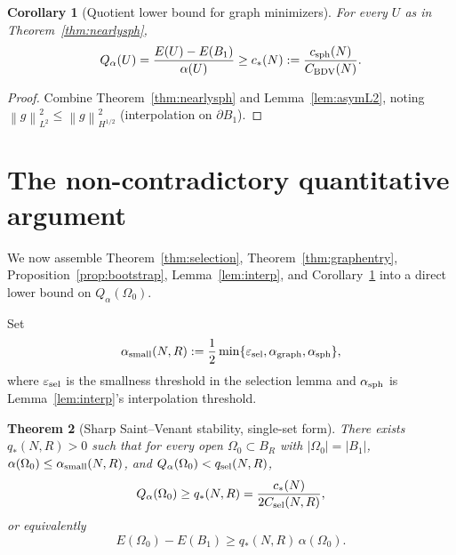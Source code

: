 \documentclass[11pt]{article}
\newtheorem{theorem}{Theorem}
\newtheorem{corollary}[theorem]{Corollary}
\theoremstyle{definition}
\newcommand{\norm}[1]{\left\|#1\right\|}
\newcommand{\abs}[1]{\left|#1\right|}
\begin{document}
\begin{corollary}[Quotient lower bound for graph minimizers]\label{cor:Qlower}
For every $U$ as in Theorem~\ref{thm:nearlysph},
\[
Q_\alpha(U)=\frac{E(U)-E(B_1)}{\alpha(U)}\ge c_*(N):=\frac{c_{\rm sph}(N)}{C_{\rm BDV}(N)}.
\]
\end{corollary}

\begin{proof}
Combine Theorem~\ref{thm:nearlysph} and Lemma~\ref{lem:asymL2}, noting
$\norm{g}_{L^2}^2\le\norm{g}_{H^{1/2}}^2$ (interpolation on $\partial B_1$).
\end{proof}

\section{The non-contradictory quantitative argument}\label{sec:argument}

We now assemble Theorem~\ref{thm:selection}, Theorem~\ref{thm:graphentry},
Proposition~\ref{prop:bootstrap}, Lemma~\ref{lem:interp}, and
Corollary~\ref{cor:Qlower} into a direct lower bound on
$Q_\alpha(\Omega_0)$.

Set
\[
\alpha_{\rm small}(N,R):=\frac12\min\{\varepsilon_{\rm sel},\alpha_{\rm graph},
\alpha_{\rm sph}\},
\]
where $\varepsilon_{\rm sel}$ is the smallness threshold in the selection
lemma and $\alpha_{\rm sph}$ is Lemma~\ref{lem:interp}'s interpolation
threshold.

\begin{theorem}[Sharp Saint--Venant stability, single-set form]\label{thm:sv-sharp}
There exists $q_*(N,R)>0$ such that for every open
$\Omega_0\subset B_R$ with $\abs{\Omega_0}=\abs{B_1}$,
$\alpha(\Omega_0)\le \alpha_{\rm small}(N,R)$, and
$Q_\alpha(\Omega_0)<q_{\rm sel}(N,R)$,
\[
Q_\alpha(\Omega_0)\ge q_*(N,R)=\frac{c_*(N)}{2C_{\rm sel}(N,R)},
\]
or equivalently
\[
E(\Omega_0)-E(B_1)\ge q_*(N,R)\,\alpha(\Omega_0).
\]
\end{theorem}
\end{document}
